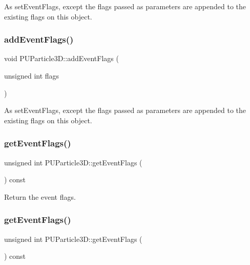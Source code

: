 As set\+Event\+Flags, except the flags passed as parameters are appended to the existing flags on this object. \mbox{\label{structPUParticle3D_a773a59d4e9b2c7f89486b0c8168a8330}} 
\subsubsection{\texorpdfstring{add\+Event\+Flags()}{addEventFlags()}\hspace{0.1cm}{\footnotesize\ttfamily [2/2]}}
{\footnotesize\ttfamily void P\+U\+Particle3\+D\+::add\+Event\+Flags (\begin{DoxyParamCaption}\item[{unsigned int}]{flags }\end{DoxyParamCaption})\hspace{0.3cm}{\ttfamily [inline]}}

As set\+Event\+Flags, except the flags passed as parameters are appended to the existing flags on this object. \mbox{\label{structPUParticle3D_af1eea76d75ae71217e6b3c6992c76e3b}} 
\subsubsection{\texorpdfstring{get\+Event\+Flags()}{getEventFlags()}\hspace{0.1cm}{\footnotesize\ttfamily [1/2]}}
{\footnotesize\ttfamily unsigned int P\+U\+Particle3\+D\+::get\+Event\+Flags (\begin{DoxyParamCaption}{ }\end{DoxyParamCaption}) const\hspace{0.3cm}{\ttfamily [inline]}}

Return the event flags. \mbox{\label{structPUParticle3D_af1eea76d75ae71217e6b3c6992c76e3b}} 
\subsubsection{\texorpdfstring{get\+Event\+Flags()}{getEventFlags()}\hspace{0.1cm}{\footnotesize\ttfamily [2/2]}}
{\footnotesize\ttfamily unsigned int P\+U\+Particle3\+D\+::get\+Event\+Flags (\begin{DoxyParamCaption}{ }\end{DoxyParamCaption}) const\hspace{0.3cm}{\ttfamily [inline]}}

